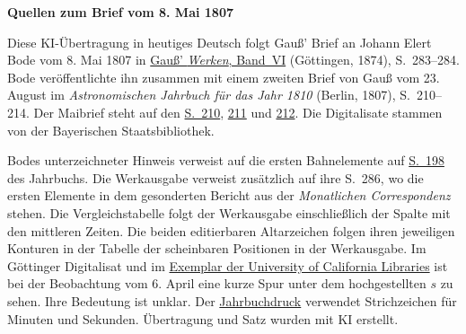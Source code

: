 \clearpage\thispagestyle{empty}
\begin{center}\textbf{Quellen zum Brief vom 8. Mai 1807}\end{center}
\noindent Diese KI-Übertragung in heutiges Deutsch folgt Gauß’ Brief an Johann Elert Bode vom 8. Mai 1807 in \href{https://gdz.sub.uni-goettingen.de/id/PPN236007467}{Gauß’ \textit{Werken}, Band~VI} (Göttingen, 1874), S.~283--284. Bode veröffentlichte ihn zusammen mit einem zweiten Brief von Gauß vom 23. August im \textit{Astronomischen Jahrbuch für das Jahr 1810} (Berlin, 1807), S.~210--214. Der Maibrief steht auf den \href{https://www.digitale-sammlungen.de/en/view/bsb10538339?page=220}{S.~210}, \href{https://www.digitale-sammlungen.de/en/view/bsb10538339?page=221}{211} und \href{https://www.digitale-sammlungen.de/en/view/bsb10538339?page=222}{212}. Die Digitalisate stammen von der Bayerischen Staatsbibliothek.
\par\medskip
Bodes unterzeichneter Hinweis verweist auf die ersten Bahnelemente auf \href{https://www.digitale-sammlungen.de/en/view/bsb10538339?page=208}{S.~198} des Jahrbuchs. Die Werkausgabe verweist zusätzlich auf ihre S.~286, wo die ersten Elemente in dem gesonderten Bericht aus der \textit{Monatlichen Correspondenz} stehen. Die Vergleichstabelle folgt der Werkausgabe einschließlich der Spalte mit den mittleren Zeiten. Die beiden editierbaren Altarzeichen folgen ihren jeweiligen Konturen in der Tabelle der scheinbaren Positionen in der Werkausgabe. Im Göttinger Digitalisat und im \href{https://archive.org/details/werkecarlf06gausrich}{Exemplar der University of California Libraries} ist bei der Beobachtung vom 6. April eine kurze Spur unter dem hochgestellten $s$ zu sehen. Ihre Bedeutung ist unklar. Der \href{https://www.digitale-sammlungen.de/en/view/bsb10538437?page=218}{Jahrbuchdruck} verwendet Strichzeichen für Minuten und Sekunden. Übertragung und Satz wurden mit KI erstellt.
\clearpage
